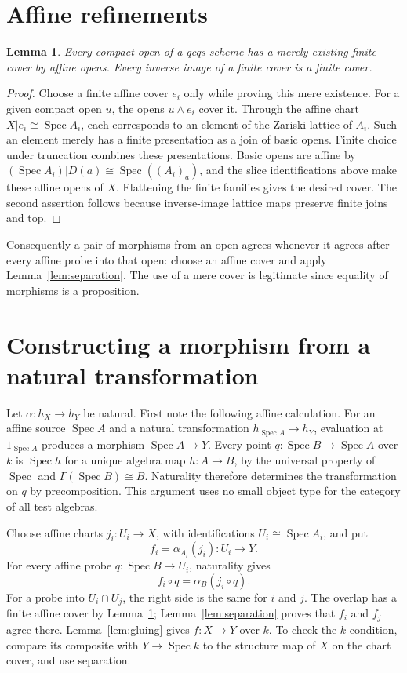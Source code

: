 \documentclass[11pt]{amsart}
\newtheorem{lemma}[theorem]{Lemma}
\theoremstyle{remark}\newtheorem{remark}[theorem]{Remark}
\newcommand{\Spec}{\operatorname{Spec}}
\begin{document}
\section{Affine refinements}
\begin{lemma}\label{lem:basis}
Every compact open of a qcqs scheme has a merely existing finite cover
by affine opens. Every inverse image of a finite cover is a finite cover.
\end{lemma}
\begin{proof}
Choose a finite affine cover $e_i$ only while proving this mere existence.
For a given compact open $u$, the opens $u\wedge e_i$ cover it. Through
the affine chart $X|e_i\cong\Spec A_i$, each corresponds to an element of
the Zariski lattice of $A_i$. Such an element merely has a finite
presentation as a join of basic opens. Finite choice under truncation
combines these presentations. Basic opens are affine by
$(\Spec A_i)|D(a)\cong\Spec((A_i)_a)$, and the slice identifications above
make these affine opens of $X$. Flattening the finite families gives
the desired cover. The second assertion follows because inverse-image
lattice maps preserve finite joins and top.
\end{proof}

Consequently a pair of morphisms from an open agrees whenever it agrees
after every affine probe into that open: choose an affine cover and
apply Lemma~\ref{lem:separation}. The use of a mere cover is legitimate
since equality of morphisms is a proposition.

\section{Constructing a morphism from a natural transformation}
Let $\alpha:h_X\to h_Y$ be natural. First note the following affine
calculation. For an affine source $\Spec A$ and a natural transformation
$h_{\Spec A}\to h_Y$, evaluation at $1_{\Spec A}$ produces a morphism
$\Spec A\to Y$. Every point $q:\Spec B\to\Spec A$ over $k$ is
$\Spec h$ for a unique algebra map $h:A\to B$, by the universal property
of $\Spec$ and $\Gamma(\Spec B)\cong B$. Naturality therefore determines
the transformation on $q$ by precomposition. This argument uses no
small object type for the category of all test algebras.

Choose affine charts $j_i:U_i\to X$, with identifications
$U_i\cong\Spec A_i$, and put
\[
 f_i=\alpha_{A_i}(j_i):U_i\to Y.
\]
For every affine probe $q:\Spec B\to U_i$, naturality gives
\begin{equation}\label{eq:natural}
 f_i\circ q=\alpha_B(j_i\circ q).
\end{equation}
For a probe into $U_i\cap U_j$, the right side is the same for $i$ and
$j$. The overlap has a finite affine cover by Lemma~\ref{lem:basis};
Lemma~\ref{lem:separation} proves that $f_i$ and $f_j$ agree there.
Lemma~\ref{lem:gluing} gives $f:X\to Y$ over $k$. To check the
$k$-condition, compare its composite with $Y\to\Spec k$ to the structure
map of $X$ on the chart cover, and use separation.
\end{document}
